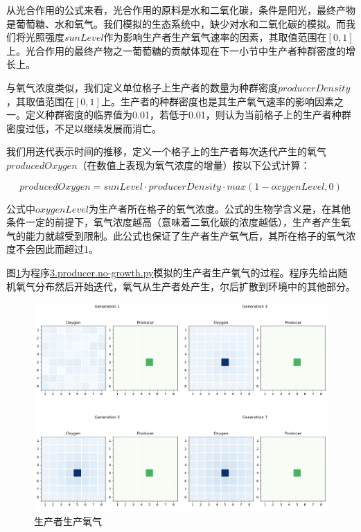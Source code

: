 \documentclass{ctexart}
\begin{document}
从光合作用的公式来看，光合作用的原料是水和二氧化碳，条件是阳光，最终产物是葡萄糖、水和氧气。我们模拟的生态系统中，缺少对水和二氧化碳的模拟。而我们将光照强度$sunLevel$作为影响生产者生产氧气速率的因素，其取值范围在$[0, 1]$上。光合作用的最终产物之一葡萄糖的贡献体现在下一小节中生产者种群密度的增长上。

与氧气浓度类似，我们定义单位格子上生产者的数量为种群密度$producerDensity$，其取值范围在$[0, 1]$上。生产者的种群密度也是其生产氧气速率的影响因素之一。定义种群密度的临界值为0.01，若低于0.01，则认为当前格子上的生产者种群密度过低，不足以继续发展而消亡。

我们用迭代表示时间的推移，定义一个格子上的生产者每次迭代产生的氧气$producedOxygen$（在数值上表现为氧气浓度的增量）按以下公式计算：

\begin{equation}
  producedOxygen = sunLevel \cdot producerDensity \cdot max(1 - oxygenLevel, 0)
\end{equation}

公式中$oxygenLevel$为生产者所在格子的氧气浓度。公式的生物学含义是，在其他条件一定的前提下，氧气浓度越高（意味着二氧化碳的浓度越低），生产者产生氧气的能力就越受到限制。此公式也保证了生产者生产氧气后，其所在格子的氧气浓度不会因此而超过1。

图\ref{fig:producer-produce}为程序\underline{3.producer.no-growth.py}模拟的生产者生产氧气的过程。程序先给出随机氧气分布然后开始迭代，氧气从生产者处产生，尔后扩散到环境中的其他部分。

\begin{figure}[ht]
  \centering
  \includegraphics[width=\textwidth]{producer-produce.png}
  \caption{生产者生产氧气}
  \label{fig:producer-produce}
\end{figure}
\end{document}
